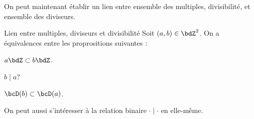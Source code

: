 \documentclass[a4paper,french,bookmarks]{article}
\begin{document}
On peut maintenant établir un lien entre ensemble des multiples, divisibilité, et ensemble des diviseurs.

\begin{property}{Lien entre multiples, diviseurs et divisibilité}{}
    Soit $(a, b) \in \bdZ^2$. On a équivalences entre les proprositions suivantes :
    
    \begin{enumerate}
        \ithand $a\bdZ \subset b\bdZ$.
        
        \ithand $b \mid a$?
        
        \ithand $\bcD(b) \subset \bcD(a)$.
    \end{enumerate}
\end{property}


On peut aussi s'intéresser à la relation binaire $\cdot \mid \cdot$ en elle-même.
\end{document}
